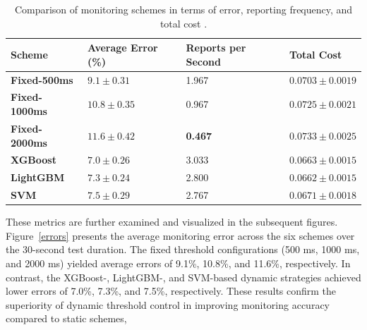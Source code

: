\begin{table}[!t]
    \centering
    \caption{Comparison of monitoring schemes in terms of error, reporting frequency, and total cost .}
    \label{summary_table}
    \begin{tabular}{p{}<{\centering} p{}<{\centering} p{}<{\centering} p{}<{\centering}}
        \toprule
        \textbf{Scheme} & \textbf{Average Error (\%)} & \textbf{Reports per Second} & \textbf{Total Cost} \\
        \midrule
        \textbf{Fixed-500ms}
            & $ 9.1 \pm 0.31$
            & 1.967
            & $0.0703 \pm 0.0019$ \\
        \textbf{Fixed-1000ms}
            & $10.8 \pm 0.35$
            & 0.967
            & $0.0725 \pm 0.0021 $ \\
        \textbf{Fixed-2000ms}
            & $11.6 \pm 0.42$
            & \textbf{0.467}
            & $0.0733 \pm 0.0025$ \\
        \textbf{XGBoost}
            & $\mathbf{7.0 \pm 0.26}$
            & 3.033
            & $0.0663 \pm 0.0015$ \\
        \textbf{LightGBM}
            & $7.3 \pm 0.24$
            & 2.800
            & $\mathbf{0.0662 \pm 0.0015}$ \\
        \textbf{SVM}
            & $7.5 \pm 0.29$
            & 2.767
            & $0.0671 \pm 0.0018$ \\
        \bottomrule
    \end{tabular}
\end{table}

These metrics are further examined and visualized in the subsequent figures. Figure~\ref{errors} presents the average monitoring error across the six schemes over the 30-second test duration. 
The fixed threshold configurations (500 ms, 1000 ms, and 2000 ms) yielded average errors of 9.1\%, 10.8\%, and 11.6\%, respectively. 
In contrast, the \mbox{XGBoost-}, \mbox{LightGBM-}, and SVM-based dynamic strategies achieved lower errors of 7.0\%, 7.3\%, and 7.5\%, respectively. 
These results confirm the superiority of dynamic threshold control in improving monitoring accuracy compared to static schemes, 

